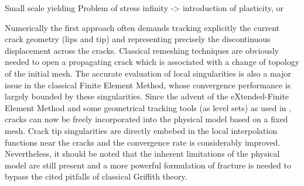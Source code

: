 Small scale yielding
Problem of stress infinity -> introduction of plasticity, or 

Numerically the first approach often demands tracking explicitly the current crack geometry (lips and tip) and representing precisely the discontinuous displacement across the cracks. Classical remeshing techniques \cite{ShahaniAmini:2009} are obviously needed to open a propagating crack which is associated with a change of topology of the initial mesh. The accurate evaluation of local singularities is also a major issue in the classical Finite Element Method, whose convergence performance is largely bounded by these singularities. Since the advent of the eXtended-Finite Element Method and some geometrical tracking tools (as level sets) as used in \cite{RethoreGravouilCombescure:2005,GregoireMaigreRethoreCombescure:2007,MenouillardRethoreCombescureBung:2006}, cracks can now be freely incorporated into the physical model based on a fixed mesh. Crack tip singularities are directly embebed in the local interpolation functions near the cracks and the convergence rate is considerably improved. Nevertheless, it should be noted that the inherent limitations of the physical model are still present and a more powerful formulation of fracture is needed to bypass the cited pitfalls of classical Griffith theory.

